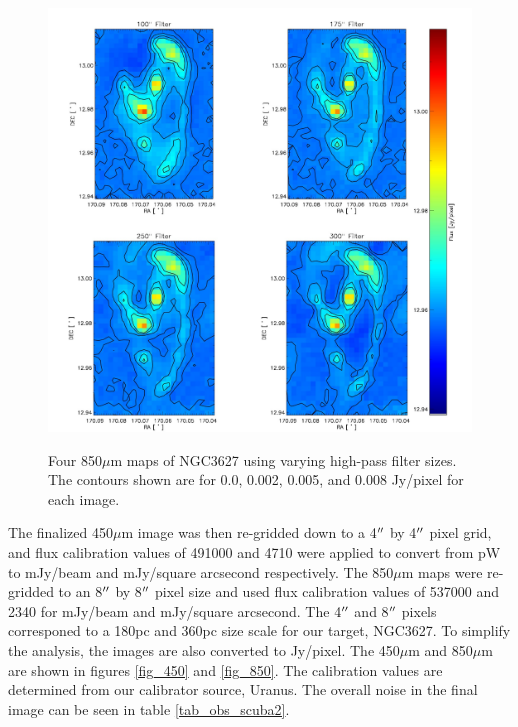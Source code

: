 \begin{figure}
  \centering
  \includegraphics[scale=0.5]{obs_imgs/850_comparison_4.jpeg}
  \label{fig:850_flt}
  \caption[850$\mu$m High-Pass Filter Images]{Four 850$\mu$m maps of NGC3627 using varying high-pass filter sizes.  The contours shown are for 0.0, 0.002, 0.005, and 0.008 Jy/pixel for each image.}
\end{figure}

The finalized 450$\mu$m image was then re-gridded down to a 4$\mbox{$^{\prime\prime}$}$ by 4$\mbox{$^{\prime\prime}$}$ pixel grid, and flux calibration values of 491000 and 4710 were applied to convert from pW to mJy/beam and mJy/square arcsecond respectively.  The 850$\mu$m maps were re-gridded to an 8$\mbox{$^{\prime\prime}$}$ by 8$\mbox{$^{\prime\prime}$}$ pixel size and used flux calibration values of 537000 and 2340 for mJy/beam and mJy/square arcsecond.  The 4$\mbox{$^{\prime\prime}$}$  and 8$\mbox{$^{\prime\prime}$}$ pixels corresponed to a 180pc and 360pc size scale for our target, NGC3627.  To simplify the analysis, the images are also converted to Jy/pixel.  The 450$\mu$m and 850$\mu$m are shown in figures \ref{fig_450} and \ref{fig_850}.  The calibration values are determined from our calibrator source, Uranus.  The overall noise in the final image can be seen in table \ref{tab_obs_scuba2}.


